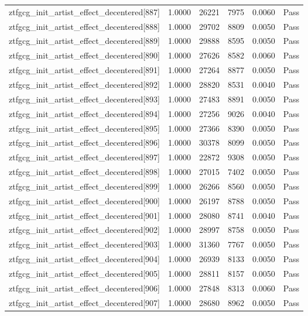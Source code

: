 \begin{table}[htbp]
\begin{tabular}{llrrll}
ztfgcg\_init\_artist\_effect\_decentered[887] & 1.0000 & 26221 & 7975 & 0.0060 & Pass \\
ztfgcg\_init\_artist\_effect\_decentered[888] & 1.0000 & 29702 & 8809 & 0.0050 & Pass \\
ztfgcg\_init\_artist\_effect\_decentered[889] & 1.0000 & 29888 & 8595 & 0.0050 & Pass \\
ztfgcg\_init\_artist\_effect\_decentered[890] & 1.0000 & 27626 & 8582 & 0.0060 & Pass \\
ztfgcg\_init\_artist\_effect\_decentered[891] & 1.0000 & 27264 & 8877 & 0.0050 & Pass \\
ztfgcg\_init\_artist\_effect\_decentered[892] & 1.0000 & 28820 & 8531 & 0.0040 & Pass \\
ztfgcg\_init\_artist\_effect\_decentered[893] & 1.0000 & 27483 & 8891 & 0.0050 & Pass \\
ztfgcg\_init\_artist\_effect\_decentered[894] & 1.0000 & 27256 & 9026 & 0.0040 & Pass \\
ztfgcg\_init\_artist\_effect\_decentered[895] & 1.0000 & 27366 & 8390 & 0.0050 & Pass \\
ztfgcg\_init\_artist\_effect\_decentered[896] & 1.0000 & 30378 & 8099 & 0.0050 & Pass \\
ztfgcg\_init\_artist\_effect\_decentered[897] & 1.0000 & 22872 & 9308 & 0.0050 & Pass \\
ztfgcg\_init\_artist\_effect\_decentered[898] & 1.0000 & 27015 & 7402 & 0.0050 & Pass \\
ztfgcg\_init\_artist\_effect\_decentered[899] & 1.0000 & 26266 & 8560 & 0.0050 & Pass \\
ztfgcg\_init\_artist\_effect\_decentered[900] & 1.0000 & 26197 & 8788 & 0.0050 & Pass \\
ztfgcg\_init\_artist\_effect\_decentered[901] & 1.0000 & 28080 & 8741 & 0.0040 & Pass \\
ztfgcg\_init\_artist\_effect\_decentered[902] & 1.0000 & 28997 & 8758 & 0.0050 & Pass \\
ztfgcg\_init\_artist\_effect\_decentered[903] & 1.0000 & 31360 & 7767 & 0.0050 & Pass \\
ztfgcg\_init\_artist\_effect\_decentered[904] & 1.0000 & 26939 & 8133 & 0.0050 & Pass \\
ztfgcg\_init\_artist\_effect\_decentered[905] & 1.0000 & 28811 & 8157 & 0.0050 & Pass \\
ztfgcg\_init\_artist\_effect\_decentered[906] & 1.0000 & 27848 & 8313 & 0.0060 & Pass \\
ztfgcg\_init\_artist\_effect\_decentered[907] & 1.0000 & 28680 & 8962 & 0.0050 & Pass \\

\end{tabular}
\end{table}
